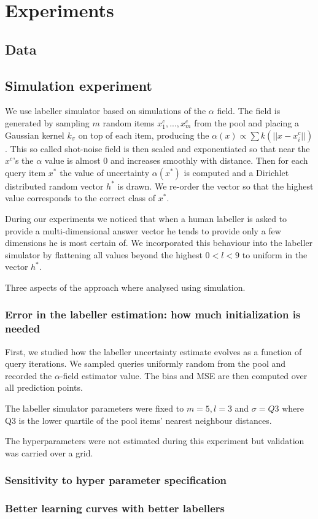 \documentclass[10pt, onecolumn]{article}
\begin{document}
\section{Experiments}

\subsection{Data}
\subsection{Simulation experiment}
We use labeller simulator based on simulations of the $\alpha$ field. The field is generated by sampling $m$ random items $x^c_1,...,x^c_m$ from the pool and placing a Gaussian kernel $k_\sigma$ on top of each item, producing the $\alpha(x)\propto\sum k(||x-x_i^c||)$. This so called shot-noise field is then scaled and exponentiated so that near the $x^c$'s the $\alpha$ value is almost 0 and increases smoothly with distance. Then for each query item $x^*$ the value of uncertainty $\alpha(x^*)$ is computed and a Dirichlet distributed random vector $h^*$ is drawn. We re-order the vector so that the highest value corresponds to the correct class of $x^*$.

During our experiments we noticed that when a human labeller is asked to provide a multi-dimensional answer vector he tends to provide only a few dimensions he is most certain of. We incorporated this behaviour into the labeller simulator by flattening all values beyond the highest $0 < l <9$ to uniform in the vector $h^*$.

Three aspects of the approach where analysed using simulation.

\subsubsection{Error in the labeller estimation: how much initialization is needed}
First, we studied how the labeller uncertainty estimate evolves as a function of query iterations. We sampled queries uniformly random from the pool and recorded the $\alpha$-field estimator value. The bias and MSE are then computed over all prediction points.

The labeller simulator parameters were fixed to $m=5, l=3$ and $\sigma=Q3$ where Q3 is the lower quartile of the pool items' nearest neighbour distances. 

The hyperparameters were not estimated during this experiment but validation was carried over a grid. 



\subsubsection{Sensitivity to hyper parameter specification}


\subsubsection{Better learning curves with better labellers}




\appendix


\end{document}
